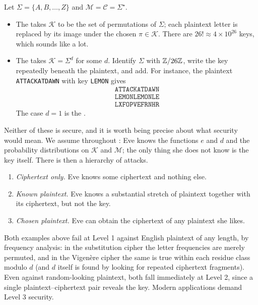 \documentclass[a4paper]{scrartcl}
\newcommand{\Cc}{\mathcal{C}}
\newcommand{\Kc}{\mathcal{K}}
\newcommand{\Mc}{\mathcal{M}}
\begin{document}
\begin{example}
	Let $\Sigma = \{A,B,\dots,Z\}$ and $\Mc = \Cc = \Sigma^\star$.
	\begin{itemize}
		\item The  takes $\Kc$ to be the set of permutations of $\Sigma$; each plaintext letter is replaced by its image under the chosen $\pi \in \Kc$. There are $26! \approx 4\times10^{26}$ keys, which sounds like a lot.
		\item The  takes $\Kc = \Sigma^d$ for some $d$. Identify $\Sigma$ with $\mathbb{Z}/26\mathbb{Z}$, write the key repeatedly beneath the plaintext, and add. For instance, the plaintext \texttt{ATTACKATDAWN} with key \texttt{LEMON} gives
		$$\begin{array}{l}
		\texttt{ATTACKATDAWN}\\ \texttt{LEMONLEMONLE}\\\hline \texttt{LXFOPVEFRNHR}\end{array}$$
		The case $d = 1$ is the .
	\end{itemize}
\end{example}

Neither of these is secure, and it is worth being precise about what security would mean. We assume throughout : Eve knows the functions $e$ and $d$ and the probability distributions on $\Kc$ and $\Mc$; the only thing she does not know is the key itself. There is then a hierarchy of attacks.

\begin{enumerate}[label=\textbf{Level \arabic*.}, leftmargin=*]
	\item \emph{Ciphertext only.} Eve knows some ciphertext and nothing else.
	\item \emph{Known plaintext.} Eve knows a substantial stretch of plaintext together with its ciphertext, but not the key.
	\item \emph{Chosen plaintext.} Eve can obtain the ciphertext of any plaintext she likes.
\end{enumerate}

\begin{remark}
	Both examples above fail at Level 1 against English plaintext of any length, by frequency analysis: in the substitution cipher the letter frequencies are merely permuted, and in the Vigen\`ere cipher the same is true within each residue class modulo $d$ (and $d$ itself is found by looking for repeated ciphertext fragments). Even against random-looking plaintext, both fall immediately at Level 2, since a single plaintext--ciphertext pair reveals the key. Modern applications demand Level 3 security.
\end{remark}
\end{document}

